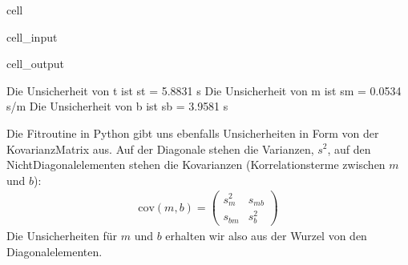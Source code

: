 \documentclass[letterpaper,10pt,english]{jupyterBook}
\begin{document}
\begin{sphinxuseclass}{cell}
\begin{sphinxVerbatimInput}
\begin{sphinxuseclass}{cell_input}
\end{sphinxuseclass}\end{sphinxVerbatimInput}
\begin{sphinxVerbatimOutput}

\begin{sphinxuseclass}{cell_output}
\begin{sphinxVerbatim}[commandchars=\\\{\}]
Die Unsicherheit von t ist 	 s\PYGZus{}t = 5.8831 s
Die Unsicherheit von m ist 	 s\PYGZus{}m = 0.0534 s/m
Die Unsicherheit von b ist 	 s\PYGZus{}b = 3.9581 s
\end{sphinxVerbatim}

\end{sphinxuseclass}\end{sphinxVerbatimOutput}

\end{sphinxuseclass}
\sphinxAtStartPar
Die Fitroutine in Python gibt uns ebenfalls Unsicherheiten in Form von der Kovarianz\sphinxhyphen{}Matrix aus. Auf der Diagonale stehen die Varianzen, \(s^2\), auf den Nicht\sphinxhyphen{}Diagonalelementen stehen die Kovarianzen (Korrelationsterme zwischen \(m\) und \(b\)):
\begin{equation*}
\begin{split}\mathrm{cov}(m,b) = 
\begin{pmatrix}
 s_m^2 & s_{mb} \\
 s_{bm} & s_b^2
\end{pmatrix} \end{split}
\end{equation*}
\sphinxAtStartPar
Die Unsicherheiten für \(m\) und \(b\) erhalten wir also aus der Wurzel von den Diagonalelementen.
\end{document}

